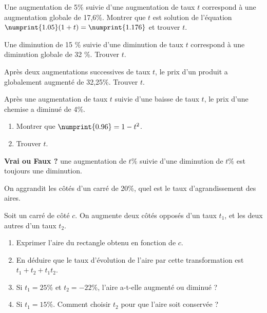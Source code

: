 \documentclass[main.tex]{subfiles}
\begin{document}
\begin{exercise}\hfill
	
	\noindent Une augmentation de 5\% suivie d’une augmentation de taux $t$ correspond à une augmentation globale de  17,6\%.
	Montrer que $t$ est solution de l'équation $\numprint{1.05}(1+t)=\numprint{1.176}$
	et trouver $t$. 
\end{exercise}
\begin{exercise} \hfill
	
	\noindent Une diminution de  15 \%  suivie d’une diminution de taux $t$ correspond à une diminution globale de 32 \%. Trouver $t$.
\end{exercise}
\begin{exercise}\hfill
	
	\noindent Après deux augmentations successives de taux $t$, le prix d’un produit a globalement augmenté de 32,25\%. 
	Trouver $t$.
\end{exercise} 
\begin{exercise} \hfill 
	
	\noindent	Après une augmentation de  taux  $t$ suivie d’une baisse de taux $t$, le prix d'une chemise a diminué de  4\%.  
	\begin{enumerate}[label={\arabic*)},leftmargin=*] 
		\item Montrer que $\numprint{0.96}=1-t^2$.  
		\item Trouver $t$.
	\end{enumerate} 
\end{exercise}  
\begin{eBox}
	\textbf{Vrai ou Faux ?} \og une augmentation de $t\%$ suivie d'une diminution de $t\%$ est toujours une diminution\fg{}.
\end{eBox} 


\begin{problem}  \hfill
	
	\noindent On aggrandit les côtés d'un carré de 20\%, quel est le taux d'agrandissement des aires.
\end{problem}

\begin{problem} \hfill
	
	\noindent Soit un carré de côté $c$. On augmente deux côtés opposés d'un taux $t_1$, et les deux autres d'un taux $t_2$. 
	\begin{enumerate}[label=\arabic*), leftmargin=*]
		\item Exprimer l'aire du rectangle obtenu en fonction de $c$. 
		\item En déduire que le taux d'évolution de l'aire par cette transformation est $t_1+t_2+t_1t_2$.
		\item Si $t_1=25\%$ et $t_2=-22\%$, l'aire a-t-elle augmenté ou diminué ?
		\item Si $t_1=15\%$. Comment choisir $t_2$ pour que l'aire soit conservée ?
	\end{enumerate}
\end{problem}
\end{document}
